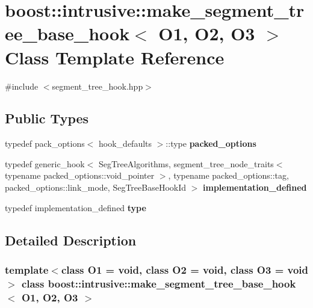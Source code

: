 \hypertarget{classboost_1_1intrusive_1_1make__segment__tree__base__hook}{}\section{boost\+:\+:intrusive\+:\+:make\+\_\+segment\+\_\+tree\+\_\+base\+\_\+hook$<$ O1, O2, O3 $>$ Class Template Reference}
\label{classboost_1_1intrusive_1_1make__segment__tree__base__hook}


{\ttfamily \#include $<$segment\+\_\+tree\+\_\+hook.\+hpp$>$}

\subsection*{Public Types}
\begin{DoxyCompactItemize}
\item 
\mbox{\label{classboost_1_1intrusive_1_1make__segment__tree__base__hook_a98fb49751f922d9d2bd29b788fae7de6}} 
typedef pack\+\_\+options$<$ hook\+\_\+defaults $>$\+::type {\bfseries packed\+\_\+options}
\item 
\mbox{\label{classboost_1_1intrusive_1_1make__segment__tree__base__hook_ac9e2687ae1be3fafd1465686917f339b}} 
typedef generic\+\_\+hook$<$ Seg\+Tree\+Algorithms, segment\+\_\+tree\+\_\+node\+\_\+traits$<$ typename packed\+\_\+options\+::void\+\_\+pointer $>$, typename packed\+\_\+options\+::tag, packed\+\_\+options\+::link\+\_\+mode, Seg\+Tree\+Base\+Hook\+Id $>$ {\bfseries implementation\+\_\+defined}
\item 
\mbox{\label{classboost_1_1intrusive_1_1make__segment__tree__base__hook_a9c140e02f782596cc309f211a16125ab}} 
typedef implementation\+\_\+defined {\bfseries type}
\end{DoxyCompactItemize}


\subsection{Detailed Description}
\subsubsection*{template$<$class O1 = void, class O2 = void, class O3 = void$>$\newline
class boost\+::intrusive\+::make\+\_\+segment\+\_\+tree\+\_\+base\+\_\+hook$<$ O1, O2, O3 $>$}

